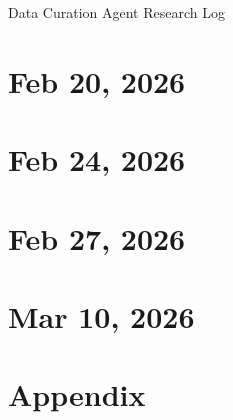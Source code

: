 \documentclass{report}
\begin{document}
Data Curation Agent Research Log
\tableofcontents

\chapter{Feb 20, 2026}


\chapter{Feb 24, 2026}


\chapter{Feb 27, 2026}



\chapter{Mar 10, 2026}




\appendix
\chapter{Appendix}

\end{document}
